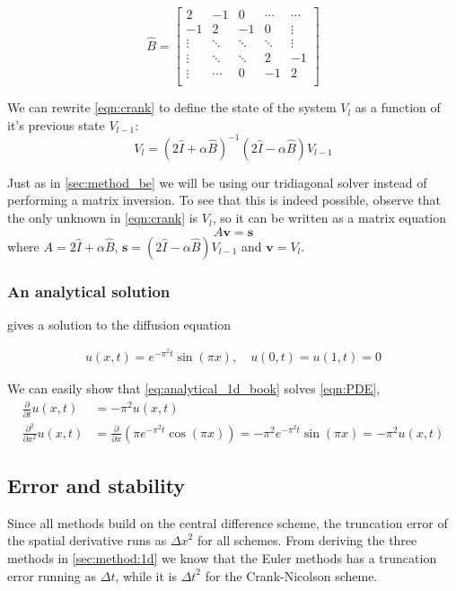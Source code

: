 \documentclass[10pt,a4paper]{article}
\newcommand{\dt}{{\Delta t}}
\newcommand{\dx}{{\Delta x}}
\newcommand{\fracpt}{\frac{\partial}{\partial t}}
\newcommand{\fracpx}{\frac{\partial}{\partial x}}
\newcommand{\fracpxx}{\frac{\partial^2}{\partial x^2}}
\begin{document}
\[
\hat{B} = \begin{bmatrix}
2 & -1 & 0 & \cdots & \cdots \\
-1 & 2 & -1 & 0 & \vdots \\
\vdots & \ddots & \ddots & \ddots & \vdots \\
\vdots & \ddots & \ddots & 2 & -1 \\
\vdots & \cdots & 0 & -1 & 2 \\
\end{bmatrix}
\]

We can rewrite \vref{eqn:crank} to define the state of the system $V_l$ as a function of it's previous state $V_{l-1}$:
\begin{equation}
V_l = (2\hat{I}+\alpha \hat{B})^{-1} (2\hat{I} - \alpha \hat{B})V_{l-1}
\end{equation}

Just as in \vref{sec:method_be} we will be using our tridiagonal solver instead of performing a matrix inversion. To see that this is indeed possible, observe that the only unknown in \vref{eqn:crank} is $V_l$, so it can be written as a matrix equation \[
A \mathbf{v} = \mathbf{s}
\] where $A = 2\hat{I}+\alpha \hat{B}$, $ \mathbf{s} = (2\hat{I} - \alpha \hat{B})V_{l-1}$ and $\mathbf{v} = V_l$.



\subsubsection{An analytical solution}\label{sec:analytical_1d}
\cite{inf-mat2351_book} gives a solution to the diffusion equation

\begin{align}\label{eq:analytical_1d_book}
    u(x, t) = e^{-\pi^2 t} \sin(\pi x) , \quad u(0, t) = u(1, t) = 0
\end{align}

We can easily show that \vref{eq:analytical_1d_book} solves \vref{eqn:PDE},
\begin{align}
\fracpt u(x, t) &= -\pi^2 u(x, t) \\
\fracpxx u(x, t) &= \fracpx \left(\pi e^{-\pi^2 t} \cos(\pi x) \right)
= -\pi^2 e^{-\pi^2 t} \sin(\pi x) = -\pi^2 u(x, t)
\end{align}



\subsection{Error and stability}
\label{sec:method:1d:error}
Since all methods build on the central difference scheme, the truncation error of the spatial derivative runs as $\dx^2$ for all schemes. From deriving the three methods in \ref{sec:method:1d} we know that the Euler methods has a truncation error running as $\dt$, while it is $\dt^2$ for the Crank-Nicolson scheme.
\end{document}
